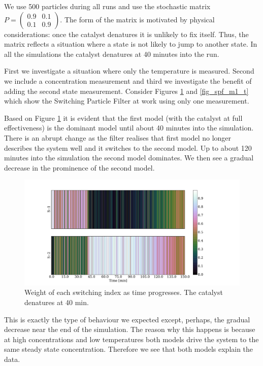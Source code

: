 \documentclass[../masters.tex]{subfiles}
\begin{document}
We use 500 particles during all runs and use the stochastic matrix $P=\begin{pmatrix}
0.9 & 0.1 \\ 0.1 & 0.9
\end{pmatrix}.$ The form of the matrix is motivated by physical considerations: once the catalyst denatures it is unlikely to fix itself. Thus, the matrix reflects a situation where a state is not likely to jump to another state. In all the simulations the catalyst denatures at 40 minutes into the run.

First we investigate a situation where only the temperature is measured. Second we include a concentration measurement and third we investigate the benefit of adding the second state measurement. Consider Figures \ref{fig_spf_m1_s} and \ref{fig_spf_m1_t} which show the Switching Particle Filter at work using only one measurement. 

Based on Figure \ref{fig_spf_m1_s} it is evident that the first model (with the catalyst at full effectiveness) is the dominant model until about 40 minutes into the simulation. There is an abrupt change as the filter realises that first model no longer describes the system well and it switches to the second model. Up to about 120 minutes into the simulation the second model dominates. We then see a gradual decrease in the prominence of the second model. 
\begin{figure}[H] 
\centering
\includegraphics[scale=0.3]{spf_m1_s.pdf}
\caption{Weight of each switching index as time progresses. The catalyst denatures at 40 min.}
\label{fig_spf_m1_s}
\end{figure}
This is exactly the type of behaviour we expected except, perhaps, the gradual decrease near the end of the simulation. The reason why this happens is because at high concentrations and low temperatures both models drive the system to the same steady state concentration. Therefore we see that both models explain the data.
\end{document}
